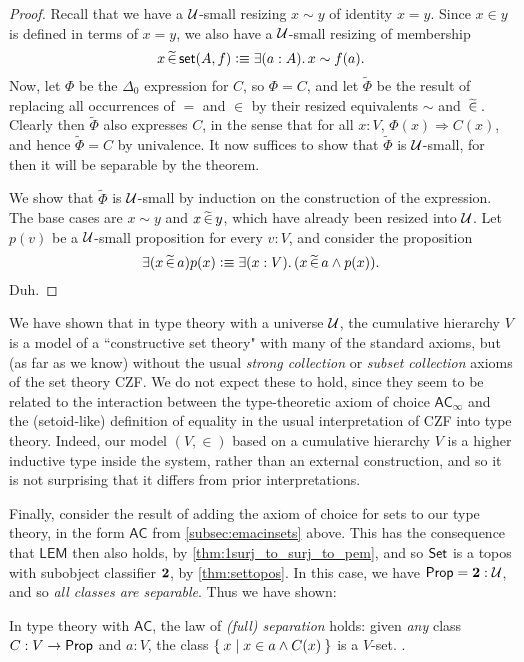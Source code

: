 \begin{proof}
Recall that we have a $\mathcal{U}$-small resizing $x\sim y$ of identity $x = y$. Since $x\in y$ is defined in terms of $x=y$, we also have a $\mathcal{U}$-small resizing of membership $$x\bin\vset(A,f) \defeq \exis{a:A} x\sim f(a).$$ Now, let $\Phi$ be the $\Delta_0$ expression for $C$, so $\Phi = C$, and let $\widetilde{\Phi}$ be the result of replacing all occurrences of $=$ and $\in$ by their resized equivalents $\sim$ and $\,\widetilde{\in}\,$.  Clearly then $\widetilde{\Phi}$ also expresses $C$, in the sense that for all $x:V$, $\Phi(x) \Rightarrow C(x)$, and hence $\widetilde{\Phi}=C$ by univalence.  It now suffices to show that $\widetilde{\Phi}$ is $\mathcal{U}$-small, for then it will be separable by the theorem.  

We show that  $\widetilde{\Phi}$ is $\mathcal{U}$-small by induction on the construction of the expression.  The base cases are $x\sim y$ and $x\,\widetilde{\in}\, y$, which have already been resized into $\mathcal{U}$.  Let $p(v)$ be a $\mathcal{U}$-small proposition for every $v:V$, and consider the proposition $$\exists(x\bin a)p(x) \defeq \exis{x:V}(x\bin a \land p(x)).$$
Duh.
\end{proof}

We have shown that in type theory with a universe $\mathcal{U}$, the cumulative hierarchy $V$ is a model of a ``constructive set theory" with many of the standard axioms, but (as far as we know) without the usual \emph{strong collection} or \emph{subset collection} axioms of the set theory CZF.  We do not expect these to hold, since they seem to be related to the interaction between the type-theoretic axiom of choice $\mathsf{AC}_\infty$ and the (setoid-like) definition of equality in the usual interpretation of CZF into type theory.  Indeed, our model $(V,\in)$ based on a cumulative hierarchy $V$ is a higher inductive type inside the system, rather than an external construction, and so it is not surprising that it differs from prior interpretations.

Finally, consider the result of adding the axiom of choice for sets to our type theory, in the form  $\mathsf{AC}$ from \autoref{subsec:emacinsets} above.  This has the consequence that $\mathsf{LEM}$ then also holds, by \autoref{thm:1surj_to_surj_to_pem}, and so $\mathsf{Set}$ is a topos with subobject classifier $\mathbf{2}$, by \autoref{thm:settopos}.  In this case, we have $\mathsf{Prop} = \mathbf{2}:\mathcal{U}$, and so \emph{all classes are separable}.  Thus we have shown:

\begin{lem}\label{lem:fullsep}
In type theory with $\mathsf{AC}$, the law of \emph{(full) separation} holds: given \emph{any} class $C : V \to \mathsf{Prop}$ and $a : V$, the class $\Set{x | x \in a \land C(x)}$ is a $V$-set. .
\end{lem}

